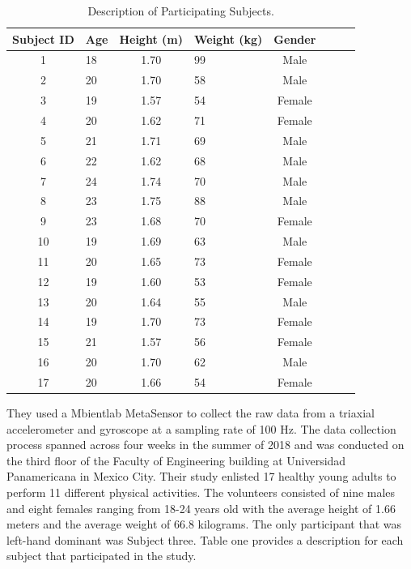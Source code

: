 \documentclass{llncs}
\begin{document}
\begin{table}
	\begin{center}
		\caption{Description of Participating Subjects.}\label{table1}
		\begin{tabular}{clclclc|c}
			\toprule
			Subject ID & Age & Height (m) & Weight (kg) & Gender\\
			\midrule
			1 &  18 & 1.70 & 99 & Male\\
			2 &  20 & 1.70 & 58 & Male\\
			3 & 19 & 1.57 & 54 & Female\\
			4 & 20 & 1.62 & 71 & Female\\
			5 & 21 & 1.71 & 69 & Male\\
			6 & 22 & 1.62 & 68 & Male\\
			7 & 24 & 1.74 & 70 & Male\\
			8 & 23 & 1.75 & 88 & Male\\
			9 & 23 & 1.68 & 70 & Female\\
			10 & 19 & 1.69 & 63 & Male\\
			11 & 20 & 1.65 & 73 & Female\\
			12 & 19 & 1.60 & 53 & Female\\
			13 & 20 & 1.64 & 55 & Male\\
			14 & 19 & 1.70 & 73 & Female\\
			15 & 21 & 1.57 & 56 & Female\\
			16 & 20 & 1.70 & 62 & Male\\
			17 & 20 & 1.66 & 54 & Female\\
			\bottomrule
		\end{tabular}
	\end{center}
\end{table}

	They used a Mbientlab MetaSensor to collect the raw data from a triaxial accelerometer and gyroscope at a sampling rate of 100 Hz. The data collection process spanned across four weeks in the summer of 2018 and was conducted on the third floor of the Faculty of Engineering building at Universidad Panamericana in Mexico City.\cite{martinez2019up} Their study enlisted 17 healthy young adults to perform 11 different physical activities. The volunteers consisted of nine males and eight females ranging from 18-24 years old with the average height of 1.66 meters and the average weight of 66.8 kilograms. The only participant that was left-hand dominant was Subject three. Table one provides a description for each subject that participated in the study.
	
\end{document}
